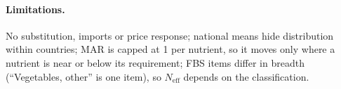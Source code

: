 \paragraph{Limitations.} No substitution, imports or price response; national means hide distribution within
countries; MAR is capped at 1 per nutrient, so it moves only where a nutrient is near or below its requirement;
FBS items differ in breadth (``Vegetables, other'' is one item), so $N_{\text{eff}}$ depends on the classification.
